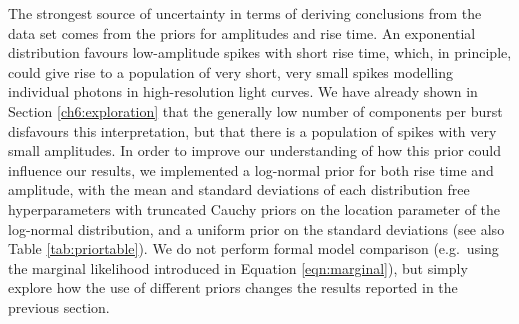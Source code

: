 \documentclass[12pt]{emulateapj}
\begin{document}
The strongest source of uncertainty in terms of deriving conclusions from the data set comes from the priors for
amplitudes and rise time. An exponential distribution favours low-amplitude spikes with short rise time, which, in principle,
could give rise to a population of very short, very small spikes modelling individual photons in high-resolution light curves. We have already shown in 
Section \ref{ch6:exploration} that the generally low number of components per burst disfavours this interpretation, but that there is a population of spikes
 with very small amplitudes. In order
to improve our understanding of how this prior could influence our results, we implemented a log-normal prior for both rise time
and amplitude, with the mean and standard deviations of each distribution free hyperparameters with truncated Cauchy priors on the location parameter of
the log-normal distribution, and a uniform prior on the standard deviations (see also Table \ref{tab:priortable}). We do not perform formal model comparison
(e.g.\ using the marginal likelihood introduced in Equation \ref{eqn:marginal}), but simply explore how the use of different priors
changes the results reported in the previous section.
\end{document}
